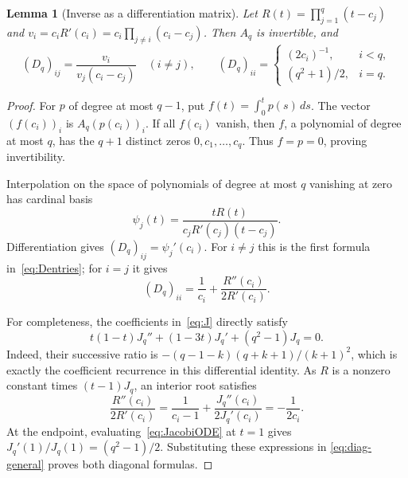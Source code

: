 \documentclass[11pt,letterpaper]{article}
\newtheorem{lemma}[theorem]{Lemma}
\theoremstyle{remark}
\begin{document}
\begin{lemma}[Inverse as a differentiation matrix]\label{lem:diff}
Let \(R(t)=\prod_{j=1}^q(t-c_j)\) and
\(v_i=c_iR'(c_i)=c_i\prod_{j\ne i}(c_i-c_j)\). Then \(A_q\) is invertible, and
\begin{equation}\label{eq:Dentries}
 (D_q)_{ij}=\frac{v_i}{v_j(c_i-c_j)}\quad(i\ne j),\qquad
 (D_q)_{ii}=\begin{cases}
 (2c_i)^{-1},&i<q,\\
 (q^2+1)/2,&i=q.
 \end{cases}
\end{equation}
\end{lemma}
\begin{proof}
For \(p\) of degree at most \(q-1\), put \(f(t)=\int_0^tp(s)\,ds\).
The vector \((f(c_i))_i\) is \(A_q(p(c_i))_i\). If all \(f(c_i)\) vanish,
then \(f\), a polynomial of degree at most \(q\), has the \(q+1\) distinct
zeros \(0,c_1,\ldots,c_q\). Thus \(f=p=0\), proving invertibility.

Interpolation on the space of polynomials of degree at most \(q\) vanishing
at zero has cardinal basis
\[
 \psi_j(t)=\frac{tR(t)}{c_jR'(c_j)(t-c_j)}.
\]
Differentiation gives \((D_q)_{ij}=\psi_j'(c_i)\). For \(i\ne j\) this is the
first formula in~\eqref{eq:Dentries}; for \(i=j\) it gives
\begin{equation}\label{eq:diag-general}
 (D_q)_{ii}=\frac1{c_i}+\frac{R''(c_i)}{2R'(c_i)}.
\end{equation}

For completeness, the coefficients in~\eqref{eq:J} directly satisfy
\begin{equation}\label{eq:JacobiODE}
 t(1-t)J_q''+(1-3t)J_q'+(q^2-1)J_q=0.
\end{equation}
Indeed, their successive ratio is
\(- (q-1-k)(q+k+1)/(k+1)^2\), which is exactly the coefficient recurrence
in this differential identity.
As \(R\) is a nonzero constant times \((t-1)J_q\), an interior root satisfies
\[
 \frac{R''(c_i)}{2R'(c_i)}
 =\frac1{c_i-1}+\frac{J_q''(c_i)}{2J_q'(c_i)}
 =-\frac1{2c_i}.
\]
At the endpoint, evaluating~\eqref{eq:JacobiODE} at \(t=1\) gives
\(J_q'(1)/J_q(1)=(q^2-1)/2\). Substituting these expressions in
\eqref{eq:diag-general} proves both diagonal formulas.
\end{proof}
\end{document}

